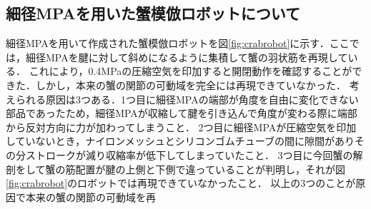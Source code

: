 \documentclass{jarticle}
\begin{document}
\vspace*{-1mm}
\subsection{細径MPAを用いた蟹模倣ロボットについて}

細径MPAを用いて作成された蟹模倣ロボットを図\ref{fig:crabrobot}に示す．ここでは，細径MPAを腱に対して斜めになるように集積して蟹の羽状筋を再現している．
これにより，0.4MPaの圧縮空気を印加すると開閉動作を確認することができた．しかし，本来の蟹の関節の可動域を完全には再現できていなかった．
考えられる原因は3つある．1つ目に細径MPAの端部が角度を自由に変化できない部品であったため，細径MPAが収縮して腱を引き込んで角度が変わる際に端部から反対方向に力が加わってしまうこと．
2つ目に細径MPAが圧縮空気を印加していないとき，ナイロンメッシュとシリコンゴムチューブの間に隙間がありその分ストロークが減り収縮率が低下してしまっていたこと．
3つ目に今回蟹の解剖をして蟹の筋配置が腱の上側と下側で違っていることが判明し，それが図\ref{fig:crabrobot}のロボットでは再現できていなかったこと．
以上の3つのことが原因で本来の蟹の関節の可動域を再
\end{document}
